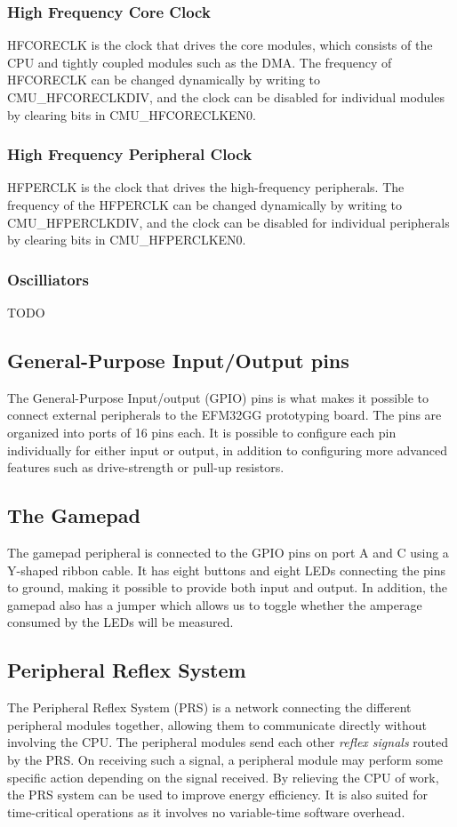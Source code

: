 \subsubsection{High Frequency Core Clock}
HFCORECLK is the clock that drives the core modules, which consists of the CPU and tightly coupled modules such as the DMA. The frequency of HFCORECLK can be changed dynamically by writing to CMU\_HFCORECLKDIV, and the clock can be disabled for individual modules by clearing bits in CMU\_HFCORECLKEN0. 

\subsubsection{High Frequency Peripheral Clock}
HFPERCLK is the clock that drives the high-frequency peripherals. The frequency of the HFPERCLK can be changed dynamically by writing to CMU\_HFPERCLKDIV, and the clock can be disabled for individual peripherals by clearing bits in CMU\_HFPERCLKEN0. 


\subsubsection{Oscilliators}
TODO %

\subsection{General-Purpose Input/Output pins}
The General-Purpose Input/output (GPIO) pins is what makes it possible to connect external peripherals to the EFM32GG prototyping board. The pins are organized into ports of 16 pins each. It is possible to configure each pin individually for either input or output, in addition to configuring more advanced features such as drive-strength or pull-up resistors.


\subsection{The Gamepad}
The gamepad peripheral is connected to the GPIO pins on port A and C using a Y-shaped ribbon cable. It has eight buttons and eight LEDs connecting the pins to ground, making it possible to provide both input and output. In addition, the gamepad also has a jumper which allows us to toggle whether the amperage consumed by the LEDs will be measured.


\subsection{Peripheral Reflex System}
The Peripheral Reflex System (PRS) is a network connecting the different peripheral modules together, allowing them to communicate directly without involving the CPU. The peripheral modules send each other \emph{reflex signals} routed by the PRS. On receiving such a signal, a peripheral module may perform some specific action depending on the signal received. By relieving the CPU of work, the PRS system can be used to improve energy efficiency. It is also suited for time-critical operations as it involves no variable-time software overhead.


